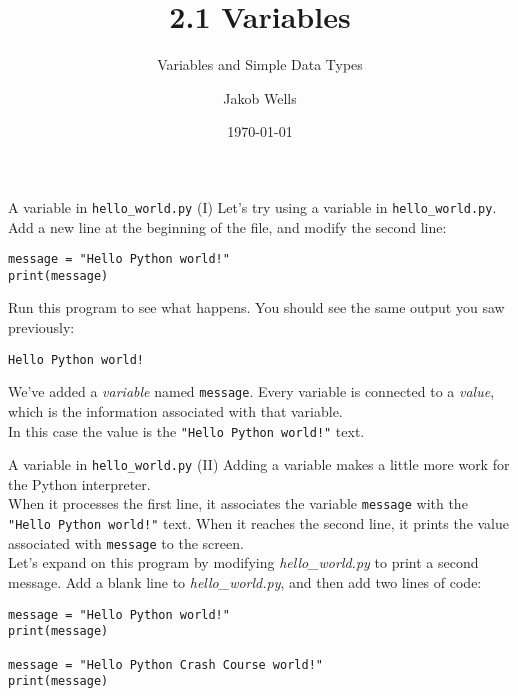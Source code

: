 \documentclass[aspectratio=169]{beamer}
\title{2.1 Variables}
\subtitle{Variables and Simple Data Types}
\author{Jakob Wells}
\begin{document}
\date{\today}


\begin{frame}
    \titlepage{}
\end{frame}


\begin{frame}[fragile]{A variable in \texttt{hello\_world.py} (I)}
    Let's try using a variable in \texttt{hello\_world.py}.
    Add a new line at the beginning of the file, and modify the second line:
    \vspace{10pt}
    \begin{Verbatim}
message = "Hello Python world!"
print(message)
    \end{Verbatim}
    \vspace{10pt}
    Run this program to see what happens.
    You should see the same output you saw previously:
    \begin{Verbatim}
Hello Python world!
    \end{Verbatim}
    \vspace{10pt}
    We've added a \textit{variable} named \texttt{message}.
    Every variable is connected to a \textit{value}, which is the information associated with that variable. \\
    \vspace{10pt}
    In this case the value is the \texttt{"Hello Python world!"} text.
\end{frame}


\begin{frame}[fragile]{A variable in \texttt{hello\_world.py} (II)}
    Adding a variable makes  a little more work for the Python interpreter. \\
    \vspace{10pt}
    When it processes the first line, it associates the variable \texttt{message} with the \texttt{"Hello Python world!"} text.
    When it reaches the second line, it prints the value associated with \texttt{message} to the screen. \\
    \vspace{10pt}
    Let's expand on this program by modifying \textit{hello\_world.py} to print a second message.
    Add a blank line to \textit{hello\_world.py}, and then add two lines of code: \\
    \vspace{10pt}
    \begin{Verbatim}
message = "Hello Python world!"
print(message)

message = "Hello Python Crash Course world!"
print(message)
    \end{Verbatim}
\end{frame}
\end{document}
